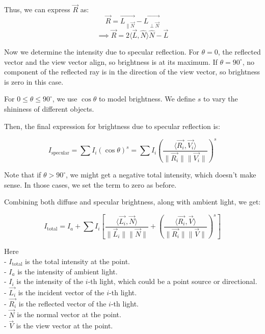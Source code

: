 \documentclass[conference]{IEEEtran}
\begin{document}
Thus, we can express $\vec{R}$ as:
$$\vec{R} = \vec{L_{\| \vec{N}}} - \vec{L_{\perp \vec{N}}}$$
$$\implies \vec{R} = 2 \langle \vec{L}, \hat{N} \rangle \hat{N} - \vec{L}$$

Now we determine the intensity due to specular reflection. For $\theta = 0$, the reflected vector and the view vector align, so brightness is at its maximum. If $\theta = 90^\circ$, no component of the reflected ray is in the direction of the view vector, so brightness is zero in this case.

For $0 \leq \theta \leq 90^\circ$, we use $\cos \theta$ to model brightness. We define $s$ to vary the shininess of different objects.

Then, the final expression for brightness due to specular reflection is:

\begin{equation}
    I_{\text{specular}} = \sum I_i (\cos \theta)^s = \sum I_i \left( \frac{\langle \vec{R_i}, \vec{V_i} \rangle}{\|\vec{R_i}\| \|\vec{V_i}\|} \right)^s
    \label{specular}
\end{equation}

Note that if $\theta > 90^\circ$, we might get a negative total intensity, which doesn't make sense. In those cases, we set the term to zero as before.

Combining both diffuse and specular brightness, along with ambient light, we get:

\begin{equation}
    {I_{\text{total}} = I_a + \sum I_i \left[ \frac{\langle \vec{L_i}, \vec{N} \rangle}{\|\vec{L}_i\| \|\vec{N}\|} + \left( \frac{\langle \vec{R_i}, \vec{V} \rangle}{\|\vec{R_i}\| \|\vec{V}\|} \right)^s \right]}
    \label{combined}
\end{equation}

Here\\
- $I_{\text{total}}$ is the total intensity at the point.\\
- $I_a$ is the intensity of ambient light.\\
- $I_i$ is the intensity of the $i$-th light, which could be a point source or directional.\\
- $\vec{L_i}$ is the incident vector of the $i$-th light.\\
- $\vec{R_i}$ is the reflected vector of the $i$-th light.\\
- $\vec{N}$ is the normal vector at the point.\\
- $\vec{V}$ is the view vector at the point.\\
\end{document}
